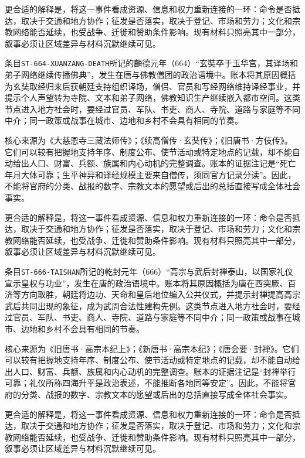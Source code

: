 更合适的解释是，将这一事件看成资源、信息和权力重新连接的一环：命令是否抵达，取决于交通和地方协作；征发是否落实，取决于登记、市场和劳力；文化和宗教网络能否延续，也受战争、迁徙和赞助条件影响。现有材料只照亮其中一部分，叙事必须让区域差异与材料沉默继续可见。

条目\texttt{ST-664-XUANZANG-DEATH}所记的麟德元年（664）“玄奘卒于玉华宫，其译场和弟子网络继续传播佛典”，发生在唐与佛教僧团的政治语境中。账本将其原因概括为玄奘取经归来后获朝廷支持组织译场，僧侣、官员和写经网络维持译经事业，并提示个人声望转为寺院、文本和弟子网络，佛教知识生产继续嵌入都市空间。这类节点进入地方社会时，要经过官员、军队、书吏、商人、寺院、道路与家庭等不同中介；同一政策或战事在城市、边地和乡村不会具有相同的节奏。

核心来源为《大慈恩寺三藏法师传》；《续高僧传·玄奘传》；《旧唐书·方伎传》。它们可以较有把握地支持年序、制度公布、使节活动或特定地点的记载，却不能自动给出人口、财富、兵额、族属和内心动机的完整调查。账本的证据注记是“死亡年月大体可靠；生平神异和译经规模主要来自僧传，须同官方记录分读”。因此，不能将官府的分类、战报的数字、宗教文本的愿望或后出的总括直接写成全体社会事实。

更合适的解释是，将这一事件看成资源、信息和权力重新连接的一环：命令是否抵达，取决于交通和地方协作；征发是否落实，取决于登记、市场和劳力；文化和宗教网络能否延续，也受战争、迁徙和赞助条件影响。现有材料只照亮其中一部分，叙事必须让区域差异与材料沉默继续可见。

条目\texttt{ST-666-TAISHAN}所记的乾封元年（666）“高宗与武后封禅泰山，以国家礼仪宣示皇权与功业”，发生在唐的政治语境中。账本将其原因概括为唐在西突厥、百济等方向取胜，朝廷将边功、天命和皇后地位编入公共仪式，并提示封禅提高高宗武后共同出现的象征，成为武周合法性建构先例。这类节点进入地方社会时，要经过官员、军队、书吏、商人、寺院、道路与家庭等不同中介；同一政策或战事在城市、边地和乡村不会具有相同的节奏。

核心来源为《旧唐书·高宗本纪上》；《新唐书·高宗本纪》；《唐会要·封禅》。它们可以较有把握地支持年序、制度公布、使节活动或特定地点的记载，却不能自动给出人口、财富、兵额、族属和内心动机的完整调查。账本的证据注记是“封禅举行可靠；礼仪所称四海升平是政治表述，不能推断各地同等安定”。因此，不能将官府的分类、战报的数字、宗教文本的愿望或后出的总括直接写成全体社会事实。

更合适的解释是，将这一事件看成资源、信息和权力重新连接的一环：命令是否抵达，取决于交通和地方协作；征发是否落实，取决于登记、市场和劳力；文化和宗教网络能否延续，也受战争、迁徙和赞助条件影响。现有材料只照亮其中一部分，叙事必须让区域差异与材料沉默继续可见。

